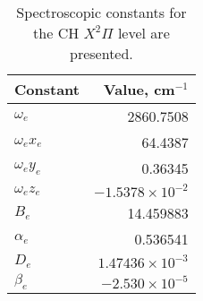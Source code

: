 \begin{table}
  \caption[Spectroscopic constants]{Spectroscopic constants for the CH \(X^2\Pi\) level are presented.}
  \begin{center}
    \begin{tabular}{lr}
      Constant & Value, cm\(^{-1}\) \tabularnewline
      \hline\hline
      \(\omega_e\) & 2860.7508 \tabularnewline
      \(\omega_ex_e\) & 64.4387 \tabularnewline
      \(\omega_ey_e\) & 0.36345 \tabularnewline
      \(\omega_ez_e\) & \(-1.5378 \times 10^{-2}\) \tabularnewline
      \(B_e\) & 14.459883 \tabularnewline
      \(\alpha_e\) & 0.536541 \tabularnewline
      \(D_e\) & \(1.47436 \times 10^{-3}\) \tabularnewline
      \(\beta_e\) & \(-2.530 \times 10^{-5}\) \tabularnewline
      \hline
    \end{tabular}
  \end{center}
  \label{tab:spectroscopicConstants}
\end{table}

